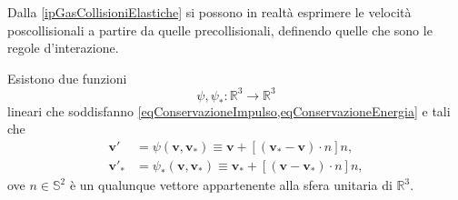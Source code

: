                 Dalla \ref{ipGasCollisioniElastiche} si possono in realtà esprimere le velocità poscollisionali a partire da quelle precollisionali, definendo quelle che sono le regole d'interazione.

                \begin{prp}\label{prpVelocitàCollisionali}
                    Esistono due funzioni \[\psi,\psi_*\colon\mathbb R^3\to\mathbb R^3\] lineari che soddisfanno \cref{eqConservazioneImpulso,eqConservazioneEnergia} e tali che
                    \begin{equation}
                        \label{eqRegoleInterazioneDeterministicheGas}
                        \begin{aligned}
                            \mathbf v'&=\psi(\mathbf v,\mathbf v_*)\equiv\mathbf v+[(\mathbf v_*-\mathbf v)\cdot n]n,\\
                            \mathbf v'_*&=\psi_*(\mathbf v,\mathbf v_*)\equiv\mathbf v_*+[(\mathbf v-\mathbf v_*)\cdot n]n,
                        \end{aligned}
                    \end{equation}
                    ove \(n\in\mathbb S^2\) è un qualunque vettore appartenente alla sfera unitaria di \(\mathbb R^3\).
                \end{prp}
